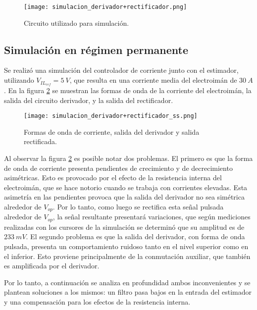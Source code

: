 \begin{figure}[H]
	\centering
	\texttt{[image: simulacion\_derivador+rectificador.png]}
	\caption{Circuito utilizado para simulación.}
	\label{fig:img_simulacion_derivador+rectificador}
\end{figure}

\subsection{Simulación en régimen permanente} \label{sec_simulacion_estimador_basico}

Se realizó una simulación del controlador de corriente junto con el estimador, utilizando $V_{IL_{ref}}=5\:V$, que resulta en una corriente media del electroimán de $30\:A$. En la figura \ref{fig:img_simulacion_derivador+rectificador_ss} se muestran las formas de onda de la corriente del electroimán, la salida del circuito derivador, y la salida del rectificador. 

\begin{figure}[H]
	\centering
	\texttt{[image: simulacion\_derivador+rectificador\_ss.png]}
	\caption{Formas de onda de corriente, salida del derivador y salida rectificada.}
	\label{fig:img_simulacion_derivador+rectificador_ss}
\end{figure}

Al observar la figura \ref{fig:img_simulacion_derivador+rectificador_ss} es posible notar dos problemas. El primero es que la forma de onda de corriente presenta pendientes de crecimiento y de decrecimiento asimétricas. Esto es provocado por el efecto de la resistencia interna del electroimán, que se hace notorio cuando se trabaja con corrientes elevadas. Esta asimetría en las pendientes provoca que la salida del derivador no sea simétrica alrededor de $V_{op}$. Por lo tanto, como luego se rectifica esta señal pulsada alrededor de $V_{op}$, la señal resultante presentará variaciones, que según mediciones realizadas con los cursores de la simulación se determinó que su amplitud es de $233\:mV$. El segundo problema es que la salida del derivador, con forma de onda pulsada, presenta un comportamiento ruidoso tanto en el nivel superior como en el inferior. Esto proviene principalmente de la conmutación auxiliar, que también es amplificada por el derivador. 

Por lo tanto, a continuación se analiza en profundidad ambos inconvenientes y se plantean soluciones a los mismos: un filtro pasa bajos en la entrada del estimador y una compensación para los efectos de la resistencia interna.


